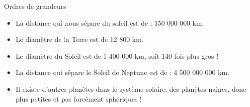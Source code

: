 \documentclass[xcolor={dvipsnames}]{beamer}
\begin{document}
\begin{frame}
\begin{block}{Ordres de grandeurs}
	\begin{itemize}
		\item La distance qui nous sépare du soleil est de : 150 000 000 km.
		\item Le diamètre de la Terre est de 12 800 km.
		\item Le diamètre du Soleil est de 1 400 000 km, soit 140 fois plus gros !
		\item La distance qui sépare le Soleil de Neptune est de : 
		4 500 000 000 km.
		\item Il existe d’autres planètes dans le système solaire, des planètes naines, donc plus petites et pas forcément sphériques !
		
	\end{itemize}
\end{block}

\end{frame}
\end{document}
